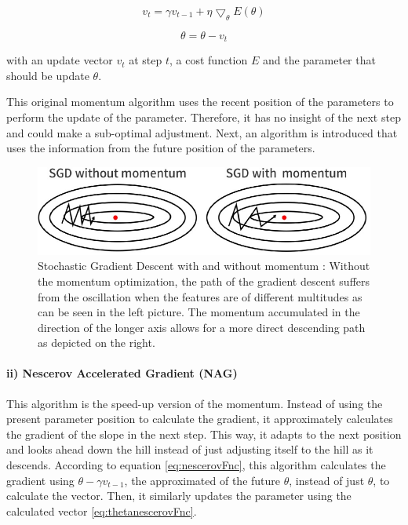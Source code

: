 	\begin{equation} \label{momentumFnc}
			v_t = \gamma v_{t-1} + {\eta}{\bigtriangledown_\theta}E(\theta)
	\end{equation}

	\begin{equation} \label{momentumthetaFnc}
			\theta = \theta - v_t
	\end{equation}

with an update vector $v_t$ at step $t$, a cost function $E$ and the parameter that should be update $\theta$.

This original momentum algorithm uses the recent position of the parameters to perform the update of the parameter. Therefore, it has no insight of the next step and could make a sub-optimal adjustment. Next, an algorithm is introduced that uses the information from the future position of the parameters.
 
\begin{figure}[tbh]
  \centering
    \includegraphics[width=\textwidth]{abbildungen/momentumGD.jpg}
  \caption{Stochastic Gradient Descent with and without momentum \cite{fig:momentumGD}: Without the momentum optimization, the path of the gradient descent suffers from the oscillation when the features are of different multitudes as can be seen in the left picture. The momentum accumulated in the direction of the longer axis allows for a more direct descending path as depicted on the right.} 
  \label{fig:ovalPlane}
\end{figure}

\paragraph*{ii) Nescerov Accelerated Gradient (NAG) \cite{NAG}} This algorithm is the speed-up version of the momentum. Instead of using the present parameter position to calculate the gradient, it approximately calculates the gradient of the slope in the next step. This way, it adapts to the next position and looks ahead down the hill instead of just adjusting itself to the hill as it descends. According to equation \eqref{eq:nescerovFnc}, this algorithm calculates the gradient using $\theta - \gamma v_{t-1}$, the approximated of the future $\theta$, instead of just $\theta$, to calculate the vector. Then, it similarly updates the parameter using the calculated vector \eqref{eq:thetanescerovFnc}.

